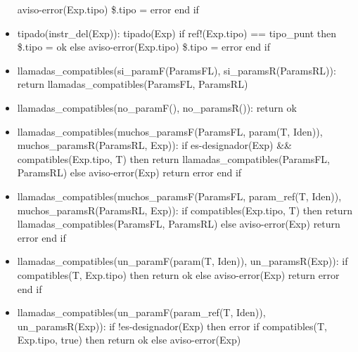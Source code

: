 \documentclass[11pt]{article}
\begin{document}
\begin{itemize}
                    \subsubitem aviso-error(Exp.tipo)
                    \subsubitem \$.tipo = error
                \subitem end if
            \item tipado(instr\_del(Exp)): 
                \subitem tipado(Exp)
                \subitem if ref!(Exp.tipo) == tipo\_punt then
                    \subsubitem \$.tipo = ok
                \subitem else
                    \subsubitem aviso-error(Exp.tipo)
                    \subsubitem \$.tipo = error
                \subitem end if
            \item llamadas\_compatibles(si\_paramF(ParamsFL), si\_paramsR(ParamsRL)): 
                \subitem return llamadas\_compatibles(ParamsFL, ParamsRL)
            \item llamadas\_compatibles(no\_paramF(), no\_paramsR()): 
                \subitem return ok
            \item llamadas\_compatibles(muchos\_paramsF(ParamsFL, param(T, Iden)), muchos\_paramsR(ParamsRL, Exp)): 
                \subitem if es-designador(Exp) \&\&  compatibles(Exp.tipo, T) then
                    \subsubitem return llamadas\_compatibles(ParamsFL, ParamsRL)
                \subitem else
                    \subsubitem aviso-error(Exp)
                    \subsubitem return error
                \subitem end if
            \item llamadas\_compatibles(muchos\_paramsF(ParamsFL, param\_ref(T, Iden)), muchos\_paramsR(ParamsRL, Exp)): 
                \subitem if compatibles(Exp.tipo, T) then
                    \subsubitem return llamadas\_compatibles(ParamsFL, ParamsRL)
                \subitem else
                    \subsubitem aviso-error(Exp)
                    \subsubitem return error
                \subitem end if
            \item llamadas\_compatibles(un\_paramF(param(T, Iden)), un\_paramsR(Exp)): 
                \subitem if compatibles(T, Exp.tipo) then
                    \subsubitem return ok
                \subitem else
                    \subsubitem aviso-error(Exp)
                    \subsubitem return error
                \subitem end if
            \item llamadas\_compatibles(un\_paramF(param\_ref(T, Iden)), un\_paramsR(Exp)): 
                \subitem if !es-designador(Exp) then
                    \subsubitem error
                \subitem if compatibles(T, Exp.tipo, true) then
                    \subsubitem return ok
                \subitem else
                    \subsubitem aviso-error(Exp)

\end{itemize}
\end{document}
